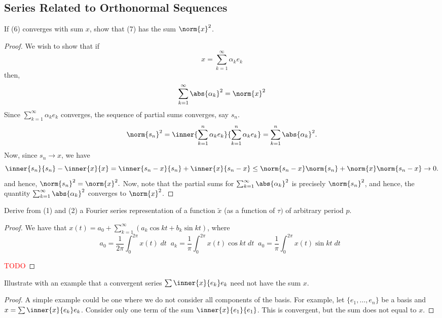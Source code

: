 \subsection{Series Related to Orthonormal Sequences}

\begin{question}
    If (6) converges with sum $x$, show that (7) has the sum $\norm{x}^2$.
    \label{section3.5-1}
\end{question}
\begin{proof}
    We wish to show that if 
    \[x = \sum_{k=1}^\infty \alpha_k e_k\]
    then, 
    \[\sum_{k=1}^\infty \abs{\alpha_k}^2 = \norm{x}^2\]
    Since $\sum_{k=1}^\infty \alpha_k e_k$ converges, the sequence of partial sums converges, say $s_n$.
    \[\norm{s_n}^2 = \inner{\sum_{k=1}^n \alpha_k e_k}{\sum_{k=1}^n \alpha_k e_k} = \sum_{k=1}^n \abs{\alpha_k}^2.\]
    Now, since $s_n \rightarrow x$, we have 
    \[\inner{s_n}{s_n} - \inner{x}{x} = \inner{s_n -x}{s_n} + \inner{x}{s_n - x 
    } \leq \norm{s_n - x}\norm{s_n} + \norm{x}\norm{s_n - x} \rightarrow 0.\]
    and hence, $\norm{s_n}^2 = \norm{x}^2.$
    Now, note that the partial sums for $\sum_{k=1}^\infty \abs{\alpha_k}^2$ is precisely $\norm{s_n}^2$, and hence, the quantity $\sum_{k=1}^\infty \abs{\alpha_k}^2$ converges to $\norm{x}^2$.
\end{proof}

\begin{question}
    Derive from (1) and (2) a Fourier series representation of a function $\tilde{x}$ (as a function of $\tau)$  of arbitrary period $p$.
    \label{section3.5-2}
\end{question}
\begin{proof}
    We have that $x(t) = a_0 + \sum_{k=1}^\infty (a_k \cos kt + b_k \sin kt)$, where
    \[a_0 = \frac{1}{2\pi}\int_{0}^{2\pi} x(t) \; dt \;\; a_k = \frac{1}{\pi}\int_{0}^{2\pi} x(t) \cos kt \; dt \;\; a_0 = \frac{1}{\pi}\int_{0}^{2\pi} x(t) \sin kt \; dt \;\;\]

    \textcolor{red}{TODO}
\end{proof}

\begin{question}
    Illustrate with an example that a convergent series $\sum \inner{x}{e_k} e_k$ need not have the sum $x$.
    \label{section3.5-3}
\end{question}
\begin{proof}
    A simple example could be one where we do not consider all components of the basis. For example, let $\{e_1 , \ldots , e_n\}$ be a basis and $x = \sum \inner{x}{e_k} e_k$. Consider only one term of the sum $\inner{x}{e_1}{e_1}$. This is convergent, but the sum does not equal to $x$.
\end{proof}

